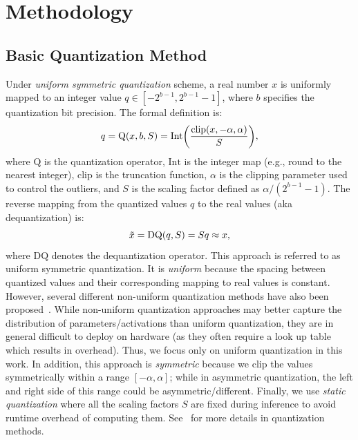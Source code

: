 \section{\textbf{Methodology}}
\label{sec:methodology}

\subsection{\textbf{Basic Quantization Method}}
\label{subsec:basic_notation}

Under \textit{uniform symmetric quantization} scheme, a real number $x$ is
uniformly mapped to an integer value $q \in [-2^{b-1}, 2^{b-1} - 1]$, where
$b$ specifies the quantization bit precision.
The formal definition is:
\begin{equation}
\label{eq:uniform_quantization}
\small
q = \mathrm{Q}(x, b, S) = \mathrm{Int}\bigg(\frac{\mathrm{clip}(x, -\alpha, \alpha)}{S}\bigg),
\end{equation}
where $\mathrm{Q}$ is the quantization operator, $\mathrm{Int}$ is the integer map (e.g., round to the nearest integer), $\mathrm{clip}$ is the truncation function, $\alpha$ is the
clipping parameter used to control the outliers, and $S$ is the scaling factor defined as $\alpha / (2^{b-1} - 1)$.
The reverse mapping from the quantized values $q$ to the real values (aka dequantization) is:
\begin{equation}
\small
\tilde{x} = \mathrm{DQ}(q, S) = Sq \approx x,
\end{equation}
where $\mathrm{DQ}$ denotes the dequantization operator. 
This approach is referred to as uniform symmetric quantization.
It is \textit{uniform} because the spacing between quantized values and their corresponding mapping to real
values is constant. However, several different non-uniform quantization methods have also been proposed~\cite{wu2016quantized, zhang2018lq, choi2018pact, park2018value}.
While non-uniform quantization approaches may better capture the distribution of parameters/activations than uniform quantization, they are in general difficult to deploy on hardware (as they often require a look up table which results in overhead).
Thus, we focus only on uniform quantization in this work.
In addition, this approach is \textit{symmetric} because we clip the values symmetrically within a range $[-\alpha, \alpha]$;
while in asymmetric quantization, the left and right side of this range could be asymmetric/different. 
Finally, we use \textit{static quantization} where all the scaling factors $S$ are fixed during inference to avoid runtime overhead of computing them. 
See~ for more details in quantization methods.



